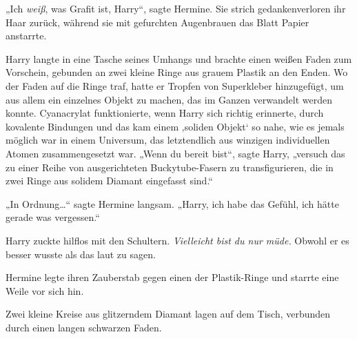 „Ich \emph{weiß}, was Grafit ist, Harry“, sagte Hermine. Sie strich gedankenverloren ihr Haar zurück, während sie mit gefurchten Augenbrauen das Blatt Papier anstarrte.

Harry langte in eine Tasche seines Umhangs und brachte einen weißen Faden zum Vorschein, gebunden an zwei kleine Ringe aus grauem Plastik an den Enden. Wo der Faden auf die Ringe traf, hatte er Tropfen von Superkleber hinzugefügt, um aus allem ein einzelnes Objekt zu machen, das im Ganzen verwandelt werden konnte. Cyanacrylat funktionierte, wenn Harry sich richtig erinnerte, durch kovalente Bindungen und das kam einem ‚soliden Objekt‘ so nahe, wie es jemals möglich war in einem Universum, das letztendlich aus winzigen individuellen Atomen zusammengesetzt war. „Wenn du bereit bist“, sagte Harry, „versuch das zu einer Reihe von ausgerichteten Buckytube-Fasern zu transfigurieren, die in zwei Ringe aus solidem Diamant eingefasst sind.“

„In Ordnung…“ sagte Hermine langsam. „Harry, ich habe das Gefühl, ich hätte gerade was vergessen.“

Harry zuckte hilflos mit den Schultern. \emph{Vielleicht bist du nur müde.} Obwohl er es besser wusste als das laut zu sagen.

Hermine legte ihren Zauberstab gegen einen der Plastik-Ringe und starrte eine Weile vor sich hin.

Zwei kleine Kreise aus glitzerndem Diamant lagen auf dem Tisch, verbunden durch einen langen schwarzen Faden.

